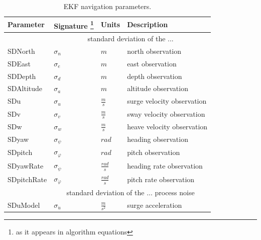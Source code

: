\begin{table}
\centering
	\caption{EKF navigation parameters.}
	\label{tab:ekf-params}
\begin{tabular}{llll}
\toprule
Parameter      &     Signature \footnote{as it appears in algorithm equations}     &     Units     &    Description  \\
\midrule
                         & \multicolumn{3}{c}{standard deviation of the ... } \\ 
\multirow{1}{*}{SDNorth} & \multirow{1}{*}{$\sigma_{n}$} & \multirow{1}{*}{$m$} & \multirow{1}{*}{north observation} \\
\multirow{1}{*}{SDEast}  & \multirow{1}{*}{$\sigma_{e}$} & \multirow{1}{*}{$m$} & \multirow{1}{*}{east observation} \\
\multirow{1}{*}{SDDepth} & \multirow{1}{*}{$\sigma_{d}$} & \multirow{1}{*}{$m$} & \multirow{1}{*}{depth observation} \\
\multirow{1}{*}{SDAltitude} & \multirow{1}{*}{$\sigma_{a}$} & \multirow{1}{*}{$m$} & \multirow{1}{*}{altitude observation} \\
\multirow{1}{*}{SDu} & \multirow{1}{*}{$\sigma_{u}$} & \multirow{1}{*}{$\frac{m}{s}$} & \multirow{1}{*}{surge velocity observation} \\
\multirow{1}{*}{SDv} & \multirow{1}{*}{$\sigma_{v}$} & \multirow{1}{*}{$\frac{m}{s}$} & \multirow{1}{*}{sway velocity observation} \\
\multirow{1}{*}{SDw} & \multirow{1}{*}{$\sigma_{w}$} & \multirow{1}{*}{$\frac{m}{s}$} & \multirow{1}{*}{heave velocity observation} \\
\multirow{1}{*}{SDyaw} & \multirow{1}{*}{$\sigma_{\psi}$} & \multirow{1}{*}{$rad$} & \multirow{1}{*}{heading observation} \\
\multirow{1}{*}{SDpitch} & \multirow{1}{*}{$\sigma_{\varphi}$} & \multirow{1}{*}{$rad$} & \multirow{1}{*}{pitch observation} \\
\multirow{1}{*}{SDyawRate} & \multirow{1}{*}{$\sigma_{\dot{\psi}}$} & \multirow{1}{*}{$\frac{rad}{s}$} & \multirow{1}{*}{heading rate observation} \\
\multirow{1}{*}{SDpitchRate} & \multirow{1}{*}{$\sigma_{\dot{\varphi}}$} & \multirow{1}{*}{$\frac{rad}{s}$} & \multirow{1}{*}{pitch rate observation} \\
\midrule
                         & \multicolumn{3}{c}{standard deviation of the ... process noise} \\
\multirow{1}{*}{SDuModel} & \multirow{1}{*}{$\sigma_{\dot{u}}$}  & \multirow{1}{*}{$\frac{m}{s^{2}}$} & \multirow{1}{*}{surge acceleration} \\

\end{tabular}
\end{table}
